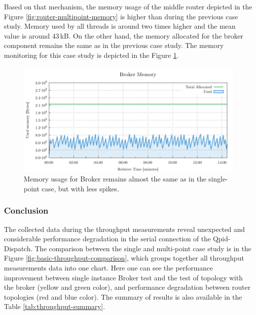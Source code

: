 Based on that mechanism, the memory usage of the middle router depicted in the Figure \ref{fig:router-multipoint-memory} is higher than during the previous case study. Memory used by all threads is around two times higher and the mean value is around 43\,kB. On the other hand, the memory allocated for the broker component remains the same as in the previous case study. The memory monitoring for this case study is depicted in the Figure \ref{fig:broker-multipoint-memory}.

\begin{figure}[H]
	\centering
	\includegraphics[width=1\linewidth]{obrazky-figures/charts/multipoint-router-broker-throughput-memory.pdf}
	\caption{Memory usage for Broker remains almost the same as in the single-point case, but with less spikes.}
	\label{fig:broker-multipoint-memory}
\end{figure}


\subsubsection*{Conclusion}
The collected data during the throughput measurements reveal unexpected and considerable performance degradation in the serial connection of the Qpid-Dispatch. The comparison between the single and multi-point case study is in the Figure \ref{fig:basic-throughput-comparison}, which groups together all throughput measurements data into one chart. Here one can see the performance improvement between single instance Broker test and the test of topology with the broker (yellow and green color), and performance degradation between router topologies (red and blue color). The summary of results is also available in the Table \ref{tab:throughput-summary}.

